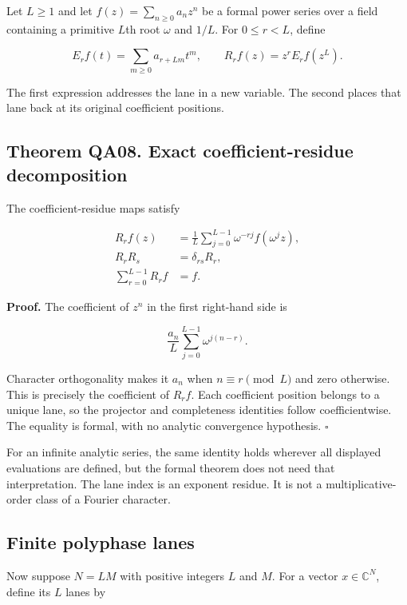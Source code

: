 Let \(L\ge1\) and let \(f(z)=\sum_{n\ge0}a_nz^n\) be a formal power
series over a field containing a primitive \(L\)th root \(\omega\) and
\(1/L\). For \(0\le r<L\), define

\[
E_rf(t)=\sum_{m\ge0}a_{r+Lm}t^m,
\qquad
R_rf(z)=z^rE_rf(z^L).
\]

The first expression addresses the lane in a new variable. The second
places that lane back at its original coefficient positions.

\hypertarget{theorem-qa08.-exact-coefficient-residue-decomposition}{%
\subsection*{Theorem QA08. Exact coefficient-residue
decomposition}\label{theorem-qa08.-exact-coefficient-residue-decomposition}}

The coefficient-residue maps satisfy

\[
\begin{aligned}
R_rf(z)&=\frac1L\sum_{j=0}^{L-1}\omega^{-rj}f(\omega^jz),\\
R_rR_s&=\delta_{rs}R_r,\\
\sum_{r=0}^{L-1}R_rf&=f.
\end{aligned}
\]

\textbf{Proof.} The coefficient of \(z^n\) in the first right-hand side
is

\[
\frac{a_n}{L}\sum_{j=0}^{L-1}\omega^{j(n-r)}.
\]

Character orthogonality makes it \(a_n\) when \(n\equiv r\pmod L\) and
zero otherwise. This is precisely the coefficient of \(R_rf\). Each
coefficient position belongs to a unique lane, so the projector and
completeness identities follow coefficientwise. The equality is formal,
with no analytic convergence hypothesis. \(\square\)

For an infinite analytic series, the same identity holds wherever all
displayed evaluations are defined, but the formal theorem does not need
that interpretation. The lane index is an exponent residue. It is not a
multiplicative-order class of a Fourier character.

\hypertarget{finite-polyphase-lanes}{%
\subsection{Finite polyphase lanes}\label{finite-polyphase-lanes}}

Now suppose \(N=LM\) with positive integers \(L\) and \(M\). For a
vector \(x\in\mathbb C^N\), define its \(L\) lanes by

